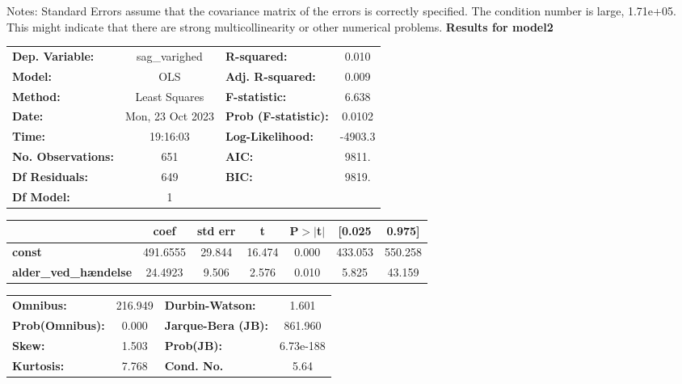 Notes: \newline
 [1] Standard Errors assume that the covariance matrix of the errors is correctly specified. \newline
 [2] The condition number is large, 1.71e+05. This might indicate that there are \newline
 strong multicollinearity or other numerical problems.
\newpage 
\textbf{Results for model2} \\ 
\begin{center}
\begin{tabular}{lclc}
\toprule
\textbf{Dep. Variable:}       &  sag\_varighed   & \textbf{  R-squared:         } &     0.010   \\
\textbf{Model:}               &       OLS        & \textbf{  Adj. R-squared:    } &     0.009   \\
\textbf{Method:}              &  Least Squares   & \textbf{  F-statistic:       } &     6.638   \\
\textbf{Date:}                & Mon, 23 Oct 2023 & \textbf{  Prob (F-statistic):} &   0.0102    \\
\textbf{Time:}                &     19:16:03     & \textbf{  Log-Likelihood:    } &   -4903.3   \\
\textbf{No. Observations:}    &         651      & \textbf{  AIC:               } &     9811.   \\
\textbf{Df Residuals:}        &         649      & \textbf{  BIC:               } &     9819.   \\
\textbf{Df Model:}            &           1      & \textbf{                     } &             \\
\bottomrule
\end{tabular}
\begin{tabular}{lcccccc}
                              & \textbf{coef} & \textbf{std err} & \textbf{t} & \textbf{P$> |$t$|$} & \textbf{[0.025} & \textbf{0.975]}  \\
\midrule
\textbf{const}                &     491.6555  &       29.844     &    16.474  &         0.000        &      433.053    &      550.258     \\
\textbf{alder\_ved\_hændelse} &      24.4923  &        9.506     &     2.576  &         0.010        &        5.825    &       43.159     \\
\bottomrule
\end{tabular}
\begin{tabular}{lclc}
\textbf{Omnibus:}       & 216.949 & \textbf{  Durbin-Watson:     } &     1.601  \\
\textbf{Prob(Omnibus):} &   0.000 & \textbf{  Jarque-Bera (JB):  } &   861.960  \\
\textbf{Skew:}          &   1.503 & \textbf{  Prob(JB):          } & 6.73e-188  \\
\textbf{Kurtosis:}      &   7.768 & \textbf{  Cond. No.          } &      5.64  \\
\bottomrule
\end{tabular}
\end{center}

